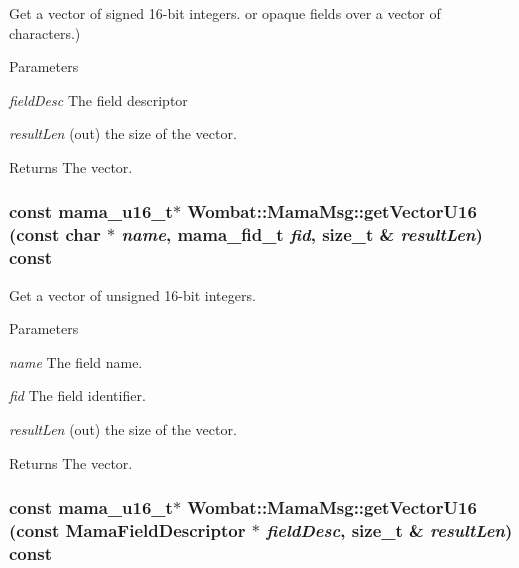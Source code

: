 Get a vector of signed 16-\/bit integers. or opaque fields over a vector of characters.) 
\begin{DoxyParams}{Parameters}
\item[{\em fieldDesc}]The field descriptor \item[{\em resultLen}](out) the size of the vector. \end{DoxyParams}
\begin{DoxyReturn}{Returns}
The vector. 
\end{DoxyReturn}
\hypertarget{classWombat_1_1MamaMsg_a2de75be6d8eade94fc3dfc8b7a246962}{
\subsubsection[{getVectorU16}]{\setlength{\rightskip}{0pt plus 5cm}const mama\_\-u16\_\-t$\ast$ Wombat::MamaMsg::getVectorU16 (const char $\ast$ {\em name}, \/  mama\_\-fid\_\-t {\em fid}, \/  size\_\-t \& {\em resultLen}) const}}
\label{classWombat_1_1MamaMsg_a2de75be6d8eade94fc3dfc8b7a246962}


Get a vector of unsigned 16-\/bit integers. 
\begin{DoxyParams}{Parameters}
\item[{\em name}]The field name. \item[{\em fid}]The field identifier. \item[{\em resultLen}](out) the size of the vector. \end{DoxyParams}
\begin{DoxyReturn}{Returns}
The vector. 
\end{DoxyReturn}
\hypertarget{classWombat_1_1MamaMsg_aa3251dc415e9ed734f6d040c831db53f}{
\subsubsection[{getVectorU16}]{\setlength{\rightskip}{0pt plus 5cm}const mama\_\-u16\_\-t$\ast$ Wombat::MamaMsg::getVectorU16 (const {\bf MamaFieldDescriptor} $\ast$ {\em fieldDesc}, \/  size\_\-t \& {\em resultLen}) const}}
\label{classWombat_1_1MamaMsg_aa3251dc415e9ed734f6d040c831db53f}


